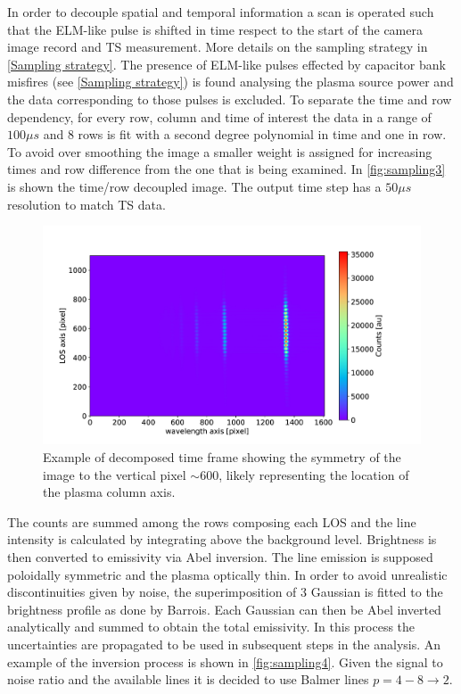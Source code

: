 In order to decouple spatial and temporal information a scan is operated such that the ELM-like pulse is shifted in time respect to the start of the camera image record and TS measurement. More details on the sampling strategy in \autoref{Sampling strategy}. The presence of ELM-like pulses effected by capacitor bank misfires (see \autoref{Sampling strategy}) is found analysing the plasma source power and the data corresponding to those pulses is excluded. To separate the time and row dependency, for every row, column and time of interest the data in a range of $100\mu s$ and 8 rows is fit with a second degree polynomial in time and one in row. To avoid over smoothing the image a smaller weight is assigned for increasing times and row difference from the one that is being examined. In \autoref{fig:sampling3} is shown the time/row decoupled image. The output time step has a $50\mu s$ resolution to match TS data.

\begin{figure}[!ht]
	\centering
	\includegraphics[width=0.7\linewidth,trim={100 30 290 200},clip]{Chapters/chapter3/figs/sample_oes2.png}
	\caption{Example of decomposed time frame showing the symmetry of the image to the vertical pixel $\sim$600, likely representing the location of the plasma column axis.}
	\label{fig:sampling3}
\end{figure}

The counts are summed among the rows composing each LOS and the line intensity is calculated by integrating above the background level. Brightness is then converted to emissivity via Abel inversion. The line emission is supposed poloidally symmetric and the plasma optically thin. In order to avoid unrealistic discontinuities given by noise, the superimposition of 3 Gaussian is fitted to the brightness profile as done by Barrois.\cite{Science2017} Each Gaussian can then be Abel inverted analytically and summed to obtain the total emissivity. In this process the uncertainties are propagated to be used in subsequent steps in the analysis. An example of the inversion process is shown in \autoref{fig:sampling4}. Given the signal to noise ratio and the available lines it is decided to use Balmer lines $p=4-8 \rightarrow 2$.

